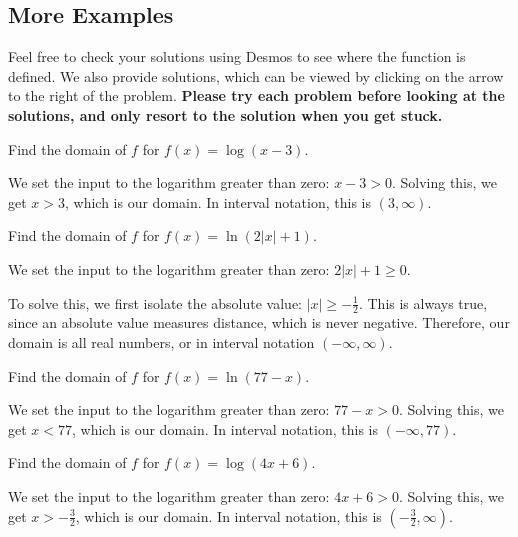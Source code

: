 \documentclass{ximera}
\begin{document}
\subsection{More Examples}
Feel free to check your solutions using Desmos to see where the function is defined. We also provide solutions, which can be viewed by clicking on the arrow to the right of the problem. \textbf{Please try each problem before looking at the solutions, and only resort to the solution when you get stuck.} 



\begin{example}
Find the domain of $f$ for $f(x) = \log(x - 3)$.
		\begin{explanation}
			\begin{expandable}

We set the input to the logarithm greater than zero: $x - 3 > 0$. Solving this, we get $x > 3$, which is our domain. In interval notation, this is $(3, \infty)$.
			\end{expandable} 
		\end{explanation}
\end{example}
\begin{example}	
Find the domain of $f$ for $f(x) = \ln(2|x| + 1)$.
		\begin{explanation}
			\begin{expandable}
We set the input to the logarithm greater than zero: $2|x| + 1 \ge 0$.

To solve this, we first isolate the absolute value: $|x| \ge -\frac{1}{2}$. This is always true, since an absolute value measures distance, which is never negative. Therefore, our domain is all real numbers, or in interval notation $(-\infty, \infty)$.
			\end{expandable}
		\end{explanation}
\end{example}
\begin{example}	
Find the domain of $f$ for $f(x) = \ln(77 - x)$.
		\begin{explanation}
			\begin{expandable}
We set the input to the logarithm greater than zero: $77-x> 0$. Solving this, we get $x < 77$, which is our domain. In interval notation, this is $(-\infty, 77)$.   
			\end{expandable}
		\end{explanation}
\end{example}
\begin{example}	
Find the domain of $f$ for $f(x) = \log(4x + 6)$.
		\begin{explanation}
			\begin{expandable}
We set the input to the logarithm greater than zero: $4x + 6> 0$. Solving this, we get $x > -\frac{3}{2}$, which is our domain. In interval notation, this is $\left(-\frac{3}{2}, \infty\right)$. 
			\end{expandable}
		\end{explanation}
\end{example}


\end{document}
